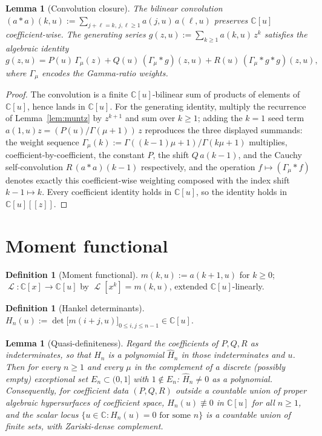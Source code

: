 \documentclass[11pt]{article}
\newtheorem{lemma}[theorem]{Lemma}
\theoremstyle{definition}
\newtheorem{definition}[theorem]{Definition}
\DeclareMathOperator{\Lop}{\mathcal{L}}
\begin{document}
\begin{lemma}[Convolution closure]\label{lem:conv}
The bilinear convolution
$(a \ast a)(k,u) := \sum_{j+\ell=k,\, j,\ell\geq 1} a(j,u)\, a(\ell,u)$
preserves $\mathbb{C}[u]$ coefficient-wise. The generating series
$g(z,u) := \sum_{k\geq 1} a(k,u)\, z^{k}$ satisfies the algebraic
identity
\[
g(z,u) = P(u)\,\Gamma_{\mu}(z) + Q(u)\,(\Gamma_{\mu}\!\ast\! g)(z,u)
+ R(u)\,(\Gamma_{\mu}\!\ast\! g \ast g)(z,u),
\]
where $\Gamma_{\mu}$ encodes the Gamma-ratio weights.
\end{lemma}

\begin{proof}
The convolution is a finite $\mathbb{C}[u]$-bilinear sum of products of
elements of $\mathbb{C}[u]$, hence lands in $\mathbb{C}[u]$. For the
generating identity, multiply the recurrence of Lemma~\ref{lem:muntz}
by $z^{k+1}$ and sum over $k \geq 1$; adding the $k=1$ seed term
$a(1,u)z = (P(u)/\Gamma(\mu+1))\,z$ reproduces the three displayed
summands: the weight sequence
$\Gamma_{\mu}(k) := \Gamma((k-1)\mu+1)/\Gamma(k\mu+1)$ multiplies,
coefficient-by-coefficient, the constant $P$, the shift $Q\,a(k-1)$,
and the Cauchy self-convolution $R\,(a\ast a)(k-1)$ respectively, and
the operation $f \mapsto (\Gamma_{\mu}\!\ast\! f)$ denotes exactly this
coefficient-wise weighting composed with the index shift
$k-1 \mapsto k$. Every coefficient identity holds in $\mathbb{C}[u]$,
so the identity holds in $\mathbb{C}[u][[z]]$.
\end{proof}

\section{Moment functional}

\begin{definition}[Moment functional]\label{def:Lop}
$m(k,u) := a(k+1,u)$ for $k\geq 0$;
$\Lop : \mathbb{C}[x] \to \mathbb{C}[u]$ by $\Lop[x^{k}] = m(k,u)$,
extended $\mathbb{C}[u]$-linearly.
\end{definition}

\begin{definition}[Hankel determinants]\label{def:Hankel}
$H_{n}(u) := \det\bigl[ m(i+j,u) \bigr]_{0\leq i,j \leq n-1} \in \mathbb{C}[u]$.
\end{definition}

\begin{lemma}[Quasi-definiteness]\label{lem:quasidef}
Regard the coefficients of $P, Q, R$ as indeterminates, so that
$H_{n}$ is a polynomial $\widehat H_{n}$ in those indeterminates and
$u$. Then for every $n \geq 1$ and every $\mu$ in the complement of a
discrete (possibly empty) exceptional set
$E_{n} \subset (0,1]$ with $1 \notin E_{n}$:
$\widehat H_{n} \neq 0$ as a polynomial. Consequently, for
coefficient data $(P,Q,R)$ outside a countable union of proper
algebraic hypersurfaces of coefficient space, $H_{n}(u) \not\equiv 0$
in $\mathbb{C}[u]$ for all $n \geq 1$, and the scalar locus
$\{u \in \mathbb{C} : H_{n}(u) = 0 \text{ for some } n\}$ is a
countable union of finite sets, with Zariski-dense complement.
\end{lemma}
\end{document}
